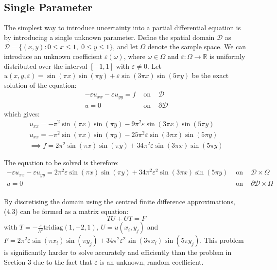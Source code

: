 \documentclass{article}
\numberwithin{equation}{section}
\begin{document}
\subsection{Single Parameter}
The simplest way to introduce uncertainty into a partial differential equation is by introducing a single unknown parameter. Define the spatial domain $\mathcal{D}$ as $\mathcal{D} = \{(x,y) : 0 \leq x \leq 1, \; 0 \leq y \leq 1 \}$, and let $\Omega$ denote the sample space. We can introduce an unknown coefficient $\varepsilon(\omega)$, where $\omega \in \Omega$ and $\varepsilon: \Omega \rightarrow \mathbb{R}$ is uniformly distributed over the interval $[-1,1]$ with $\varepsilon \neq 0$. Let $u(x,y,\varepsilon) = \sin(\pi x)\sin(\pi y) + \varepsilon \sin(3 \pi x) \sin(5 \pi y)$ be the exact solution of the equation:
\begin{eqnarray}
-\varepsilon u_{xx} -\varepsilon u_{yy} = f & \text{ on } & \mathcal{D} \nonumber \\
u = 0 & \text{ on } & \partial \mathcal{D}
\end{eqnarray}
which gives:
\begin{eqnarray}
u_{xx} = -\pi^2 \sin(\pi x) \sin(\pi y) - 9\pi^2 \varepsilon \sin(3\pi x) \sin(5\pi y) \nonumber \\
u_{xx} = -\pi^2 \sin(\pi x) \sin(\pi y) - 25\pi^2 \varepsilon \sin(3\pi x) \sin(5\pi y) \nonumber \\
\implies f = 2\pi^2 \sin(\pi x) \sin(\pi y) + 34\pi^2 \varepsilon \sin(3\pi x) \sin(5\pi y)
\end{eqnarray}

The equation to be solved is therefore:
\begin{eqnarray}
- \varepsilon u_{xx} - \varepsilon u_{yy} = 2\pi^2 \varepsilon \sin(\pi x) \sin(\pi y)+ 34 \pi^2 \varepsilon^2 \sin(3 \pi x) \sin(5 \pi y) & \text{ on } & \mathcal{D} \times \Omega \nonumber \\
u = 0 & \text{ on } & \partial \mathcal{D} \times \Omega \nonumber \\
\end{eqnarray}

By discretising the domain using the centred finite difference approximations, (4.3) can be formed as a matrix equation:
\begin{equation}
TU + UT = F
\end{equation}
with $T = -\frac{\varepsilon}{h^2} \text{tridiag}(1,-2,1)$, $U = u(x_i, y_j)$ and $F = 2\pi^2 \varepsilon \sin(\pi x_i) \sin(\pi y_j)+ 34 \pi^2 \varepsilon^2 \sin(3 \pi x_i) \sin(5 \pi y_j)$. This problem is significantly harder to solve accurately and efficiently than the problem in Section 3 due to the fact that $\varepsilon$ is an unknown, random coefficient.
\end{document}
